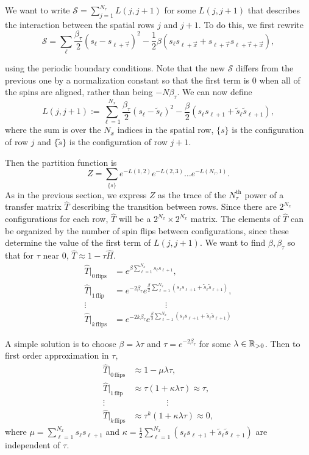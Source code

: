 \documentclass[11pt,reqno]{amsart}
\numberwithin{equation}{section}
\begin{document}
	We want to write $\mathcal{S}=\sum_{j=1}^{N_\tau} L(j,j+1)$ for some $L(j,j+1)$ that describes the interaction between the spatial rows $j$ and $j+1$.
	To do this, we first rewrite 
	\[\mathcal{S}=\sum_{\ell}\frac{\beta_\tau}{2}(s_{\ell}-s_{\ell+\vec{\tau}})^2 -\frac{1}{2}\beta (s_\ell s_{\ell+\vec{x}}+s_{\ell+\vec{\tau}}s_{\ell+\vec{\tau}+\vec{x}}), \]
	
	using the periodic boundary conditions. 
	Note that the new $\mathcal{S}$ differs from the previous one by a normalization constant so that the first term is 0 when all of the spins are aligned, rather than being $-N\beta_\tau$.
	We can now define 
	\[L(j,j+1):= \sum_{\ell=1}^{N_x} \frac{\beta_\tau}{2} (s_\ell-\tilde{s}_\ell)^2-\frac{\beta}{2}(s_\ell s_{\ell+1}+\tilde{s}_\ell \tilde{s}_{\ell+1}), \]
	where the sum is over the $N_x$ indices in the spatial row, $\{s\}$ is the configuration of row $j$ and $\{\tilde{s}\}$ is the configuration of row $j+1$.
	
	Then the partition function is 
	\[ Z=\sum_{\{s\}} e^{-L(1,2)}e^{-L(2,3)}\ldots e^{-L(N_\tau,1)}. \]
	As in the previous section, we express $Z$ as the trace of the $N_\tau^\text{th}$ power of a transfer matrix $\hat{T}$ describing the transition between rows. 
	Since there are $2^{N_x}$ configurations for each row, $\hat{T}$ will be a $2^{N_x}\times 2^{N_x}$ matrix.
	The elements of $\hat{T}$ can be organized by the number of spin flips between configurations, since these determine the value of the first term of $L(j,j+1)$. We want to find $\beta,\beta_\tau$ so that for $\tau$ near 0, $\hat{T} \approx 1 - \tau \hat{H}$.
	\begin{align*}
		\hat{T}|_{0\,\text{flips}} &= e^{\beta \sum_{\ell=1}^{N_x} s_{\ell} s_{\ell+1}},  \\		
		\hat{T}|_{1\,\text{flip}} &= e^{-2\beta_\tau} e^{\frac{\beta}{2}\sum_{\ell=1}^{N_x}(s_\ell s_{\ell+1}+\tilde{s}_\ell \tilde{s}_{\ell+1})},\\
		\vdots \quad & \qquad\qquad\qquad \vdots \\		
		\hat{T}|_{k\,\text{flips}} &= e^{-2k\beta_\tau} e^{\frac{\beta}{2}\sum_{\ell=1}^{N_x}(s_\ell s_{\ell+1}+\tilde{s}_\ell \tilde{s}_{\ell+1})}		
	\end{align*}
	
	A simple solution is to choose $\beta =\lambda \tau$ and $\tau = e^{-2\beta_\tau}$ for some $\lambda \in \mathbb{R}_{>0}$.
	Then to first order approximation in $\tau$,
	\begin{align*}
		\hat{T}|_{0\,\text{flips}} &\approx 1-\mu\lambda\tau, \\
		\hat{T}|_{1\,\text{flip}} &\approx \tau (1+\kappa \lambda\tau) \approx \tau, \\
		\vdots \quad & \qquad\qquad \vdots \\		
		\hat{T}|_{k\,\text{flips}} &\approx \tau^k (1+\kappa \lambda\tau) \approx 0, 
	\end{align*}
    where $\mu=\sum_{\ell=1}^{N_x}s_{\ell}s_{\ell+1}$ and $\kappa=\frac{1}{2}\sum_{\ell=1}^{N_x} (s_{\ell}s_{\ell+1}+\tilde{s}_{\ell}\tilde{s}_{\ell+1})$ are independent of $\tau$.
    
\end{document}
